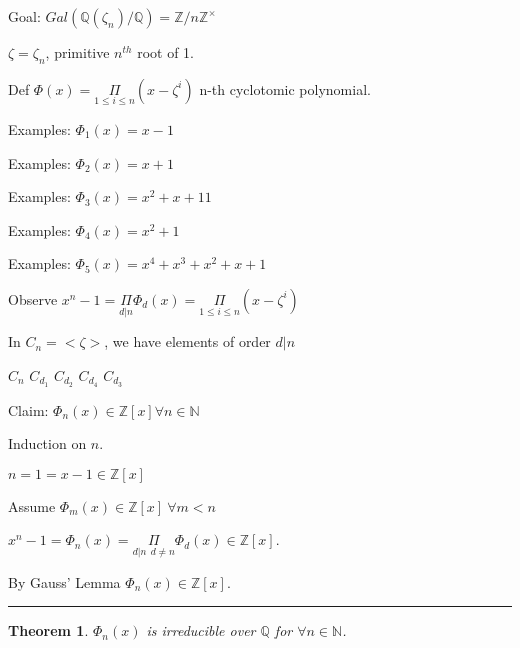 \documentclass[twoside]{article}
\newcounter{lecnum}
\newcommand{\N}{\mathbb{N}}
\newcommand{\Z}{\mathbb{Z}}
\newcommand{\Q}{\mathbb{Q}}
\newcommand{\zn}{\zeta_n}
\newcommand{\z}{\zeta}
\newtheorem{theorem}{Theorem}[lecnum]
\newenvironment{proof}{{\bf Proof:}}{\hfill\rule{2mm}{2mm}}
\begin{document}
Goal: $Gal(\Q(\zn)/\Q) = \Z / n\Z^\times$

$\zeta = \zn$, primitive $n^{th}$ root of 1. 

Def $\Phi(x) = \underset{1 \leq i \leq n}\Pi(x - \zeta^i)$
 n-th cyclotomic polynomial. 

Examples: $\Phi_1(x) = x - 1$

Examples: $\Phi_2(x) =x + 1$

Examples: $\Phi_3(x) = x^2 + x + 11$

Examples: $\Phi_4(x) = x^2 + 1$

Examples: $\Phi_5(x) = x^4 + x^3 +x^2 +x + 1$

Observe $x^n - 1 = \underset{d \vert n }\Pi\Phi_d(x) = \underset{1 \leq i \leq n}\Pi(x - \zeta^i)$

In $C_n = <\z>$, we have elements of order $d \vert n$

                        $C_n$ 
            $C_{d_1}$                $C_{d_2}$
    $C_{d_4}$          $C_{d_3}$


Claim: $\Phi_n(x) \in \Z[x] \forall n \in \N$

\begin{proof}
    Induction on $n$. 

    $n = 1 = x-1 \in \Z[x]$

    Assume    $\Phi_m(x) \in \Z[x] \  \forall m < n $

    $x^n-1 = \Phi_n(x) = \underset{d \vert n \ \ d \neq n}\Pi\Phi_d(x) \in \Z[x]$.

    By Gauss' Lemma $\Phi_n(x) \in \Z[x]$. 
\end{proof}

\begin{theorem}
    $\Phi_n(x)$ is irreducible over $\Q$ for $\forall n \in \N$.
\end{theorem}
\end{document}
